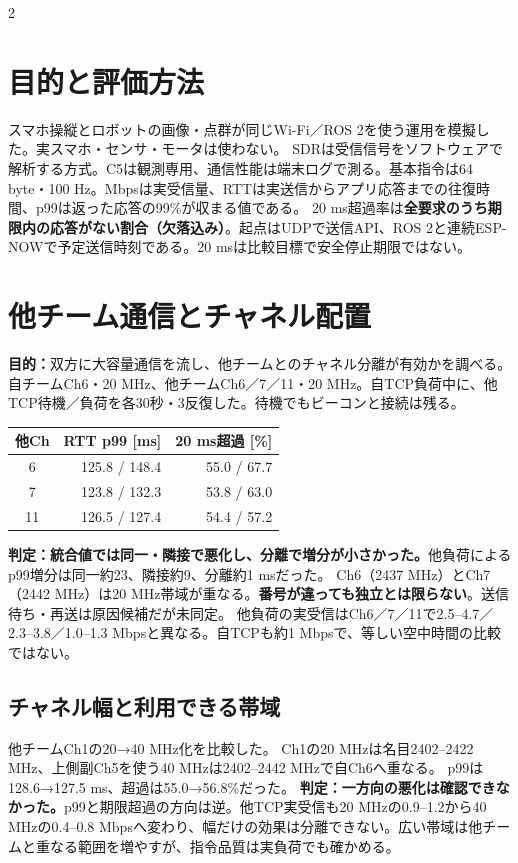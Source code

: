 \documentclass[a4paper,twocolumn,10pt]{ltjsarticle}
\begin{document}
\begin{multicols}{2}\fontsize{10}{14}\selectfont\raggedcolumns

\section{目的と評価方法}
スマホ操縦とロボットの画像・点群が同じWi-Fi／ROS 2を使う運用を模擬した。実スマホ・センサ・モータは使わない。
SDRは受信信号をソフトウェアで解析する方式。C5は観測専用、通信性能は端末ログで測る。基本指令は64 byte・100 Hz。Mbpsは実受信量、RTTは実送信からアプリ応答までの往復時間、p99は返った応答の99\%が収まる値である。
20 ms超過率は\textbf{全要求のうち期限内の応答がない割合（欠落込み）}。起点はUDPで送信API、ROS 2と連続ESP-NOWで予定送信時刻である。20 msは比較目標で安全停止期限ではない。

\section{他チーム通信とチャネル配置}
\textbf{目的：}双方に大容量通信を流し、他チームとのチャネル分離が有効かを調べる。
自チームCh6・20 MHz、他チームCh6／7／11・20 MHz。自TCP負荷中に、他TCP待機／負荷を各30秒・3反復した。待機でもビーコンと接続は残る。
\begin{center}
\small\begin{tabular}{@{}crr@{}}\toprule 他Ch & RTT p99 [ms] & 20 ms超過 [\%]\\\midrule
6 & 125.8 / 148.4 & 55.0 / 67.7\\
7 & 123.8 / 132.3 & 53.8 / 63.0\\
11 & 126.5 / 127.4 & 54.4 / 57.2\\\bottomrule\end{tabular}\end{center}
\textbf{判定：統合値では同一・隣接で悪化し、分離で増分が小さかった。}他負荷によるp99増分は同一約23、隣接約9、分離約1 msだった。
Ch6（2437 MHz）とCh7（2442 MHz）は20 MHz帯域が重なる。\textbf{番号が違っても独立とは限らない}。送信待ち・再送は原因候補だが未同定\cite{rf}。
他負荷の実受信はCh6／7／11で2.5--4.7／2.3--3.8／1.0--1.3 Mbpsと異なる。自TCPも約1 Mbpsで、等しい空中時間の比較ではない。

\columnbreak
\subsection{チャネル幅と利用できる帯域}
他チームCh1の20→40 MHz化を比較した。
Ch1の20 MHzは名目2402--2422 MHz、上側副Ch5を使う40 MHzは2402--2442 MHzで自Ch6へ重なる。
p99は128.6→127.5 ms、超過は55.0→56.8\%だった。
\textbf{判定：一方向の悪化は確認できなかった。}p99と期限超過の方向は逆。他TCP実受信も20 MHzの0.9--1.2から40 MHzの0.4--0.8 Mbpsへ変わり、幅だけの効果は分離できない。広い帯域は他チームと重なる範囲を増やすが、指令品質は実負荷でも確かめる。


\end{multicols}
\end{document}
